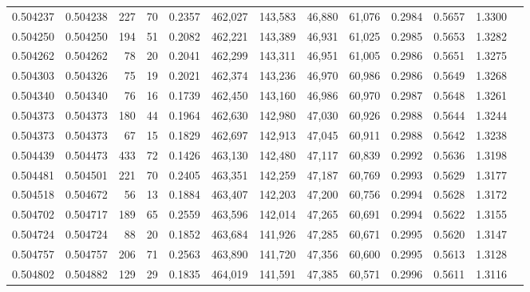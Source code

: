 \begin{tabular}{rrrrrrrrrrrrr}
0.504237 & 0.504238 &   227 &    70 &                                     0.2357 & 462,027 & 143,583 &  46,880 &  61,076 & 0.2984 & 0.5657 & 1.3300 \\
0.504250 & 0.504250 &   194 &    51 &                                     0.2082 & 462,221 & 143,389 &  46,931 &  61,025 & 0.2985 & 0.5653 & 1.3282 \\
0.504262 & 0.504262 &    78 &    20 &                                     0.2041 & 462,299 & 143,311 &  46,951 &  61,005 & 0.2986 & 0.5651 & 1.3275 \\
0.504303 & 0.504326 &    75 &    19 &                                     0.2021 & 462,374 & 143,236 &  46,970 &  60,986 & 0.2986 & 0.5649 & 1.3268 \\
0.504340 & 0.504340 &    76 &    16 &                                     0.1739 & 462,450 & 143,160 &  46,986 &  60,970 & 0.2987 & 0.5648 & 1.3261 \\
0.504373 & 0.504373 &   180 &    44 &                                     0.1964 & 462,630 & 142,980 &  47,030 &  60,926 & 0.2988 & 0.5644 & 1.3244 \\
0.504373 & 0.504373 &    67 &    15 &                                     0.1829 & 462,697 & 142,913 &  47,045 &  60,911 & 0.2988 & 0.5642 & 1.3238 \\
0.504439 & 0.504473 &   433 &    72 &                                     0.1426 & 463,130 & 142,480 &  47,117 &  60,839 & 0.2992 & 0.5636 & 1.3198 \\
0.504481 & 0.504501 &   221 &    70 &                                     0.2405 & 463,351 & 142,259 &  47,187 &  60,769 & 0.2993 & 0.5629 & 1.3177 \\
0.504518 & 0.504672 &    56 &    13 &                                     0.1884 & 463,407 & 142,203 &  47,200 &  60,756 & 0.2994 & 0.5628 & 1.3172 \\
0.504702 & 0.504717 &   189 &    65 &                                     0.2559 & 463,596 & 142,014 &  47,265 &  60,691 & 0.2994 & 0.5622 & 1.3155 \\
0.504724 & 0.504724 &    88 &    20 &                                     0.1852 & 463,684 & 141,926 &  47,285 &  60,671 & 0.2995 & 0.5620 & 1.3147 \\
0.504757 & 0.504757 &   206 &    71 &                                     0.2563 & 463,890 & 141,720 &  47,356 &  60,600 & 0.2995 & 0.5613 & 1.3128 \\
0.504802 & 0.504882 &   129 &    29 &                                     0.1835 & 464,019 & 141,591 &  47,385 &  60,571 & 0.2996 & 0.5611 & 1.3116 \\

\end{tabular}
